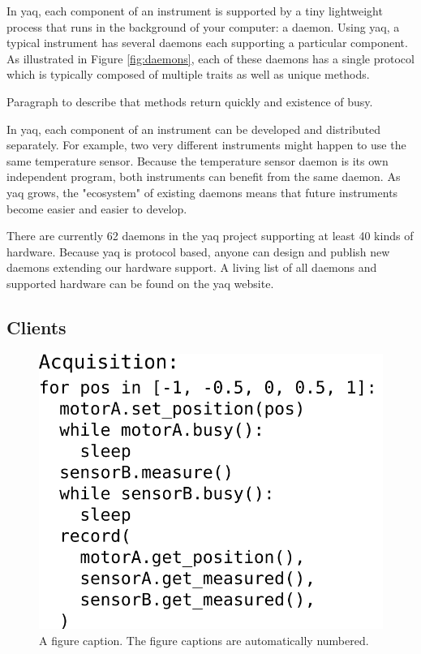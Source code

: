 \documentclass[aip, amsmath, amssymb, reprint,]{revtex4-1}
\begin{document}
In yaq, each component of an instrument is supported by a tiny lightweight process that runs in the background of your computer: a daemon.
Using yaq, a typical instrument has several daemons each supporting a particular component.
As illustrated in Figure \ref{fig:daemons}, each of these daemons has a single protocol which is typically composed of multiple traits as well as unique methods.

Paragraph to describe that methods return quickly and existence of busy.

In yaq, each component of an instrument can be developed and distributed separately.
For example, two very different instruments might happen to use the same temperature sensor.
Because the temperature sensor daemon is its own independent program, both instruments can benefit from the same daemon.
As yaq grows, the "ecosystem" of existing daemons means that future instruments become easier and easier to develop.

There are currently 62 daemons in the yaq project supporting at least 40 kinds of hardware.
Because yaq is protocol based, anyone can design and publish new daemons extending our hardware support.
A living list of all daemons and supported hardware can be found on the yaq website.

\subsection{Clients} \label{sec:clients}

\begin{figure}
  \label{fig:acquisition}
  \includegraphics[width=\columnwidth]{./figures/acquisition.png}
  \caption{ A figure caption. The figure captions are automatically numbered.}
\end{figure}
\end{document}
